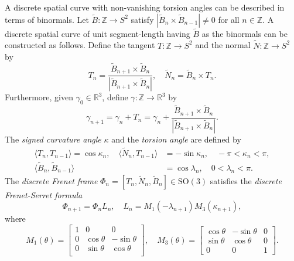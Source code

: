 \documentclass[10pt,leqno]{amsart}
\numberwithin{equation}{section}
\begin{document}
A discrete spatial curve with non-vanishing torsion angles can be described in terms of binormals.
Let $\widetilde{B}: \mathbb{Z}\rightarrow S^{2}$ 
satisfy
$\left| \widetilde{B}_{n}\times  \widetilde{B}_{n-1}\right|\neq 0$ for all $n\in \mathbb{Z}$.
A discrete spatial curve of unit segment-length 
having $\widetilde{B}$ as 
the binormals can be constructed as follows.
Define the tangent $T: \mathbb{Z}\rightarrow S^{2}$ and the normal $\widetilde{N}: \mathbb{Z}\rightarrow S^{2}$ by
\begin{equation}\label{def:tangent_and_normal}
T_n = \frac{ \widetilde{B}_{n+1}\times  \widetilde{B}_{n}}{\left| \widetilde{B}_{n+1}\times  \widetilde{B}_{n}\right|},\quad
\widetilde{N}_n = \widetilde{B}_n\times T_n.
\end{equation}
Furthermore, given $\gamma_{0}\in \mathbb{R}^3$,
define $\gamma:\mathbb{Z}\to \mathbb{R}^{3}$ by
\begin{equation}\label{def:gamma}
\gamma_{n+1} =\gamma_{n}+T_{n}=\gamma_{n}+\frac{\widetilde{B}_{n+1}\times\widetilde{B}_{n}}{\left|\widetilde{B}_{n+1}\times\widetilde{B}_{n}\right|}.
\end{equation} 
The \emph{signed curvature angle} $\kappa$
and the \emph{torsion angle}
are defined by
\begin{equation}\label{def:kappa}
\begin{split}
\langle T_{n},T_{n-1}\rangle =\cos\kappa_n, \quad\langle \widetilde{N}_{n},T_{n-1}\rangle &=-\sin\kappa_n, \quad-\pi< \kappa_n< \pi, \\
\langle\widetilde{B}_{n},\widetilde{B}_{n-1}\rangle &= \cos\lambda_n, \quad 0< \lambda_n < \pi.
\end{split}
\end{equation}
The \emph{discrete Frenet frame}
$\Phi_n=[T_n,\widetilde{N}_n,\widetilde{B}_n]\in\mathrm{SO}(3)$ satisfies the \emph{discrete Frenet-Serret formula}
\begin{equation}\label{discrete Frenet-Serret formula}
 \Phi_{n+1} = \Phi_n L_n,\quad L_n = M_1(-\lambda_{n+1}) M_3(\kappa_{n+1}),
\end{equation}
where
\begin{equation}
 M_1(\theta) = 
\left[\begin{array}{ccc}
1 & 0          & 0          \\
0 & \cos\theta  & -\sin\theta\\
0 & \sin\theta  &  \cos\theta\\
\end{array}\right],\quad
 M_3(\theta) = 
\left[\begin{array}{ccc}
 \cos\theta  & -\sin\theta & 0\\
 \sin\theta  &  \cos\theta & 0\\
     0      &       0     & 1
\end{array}\right].
\end{equation}
\end{document}
